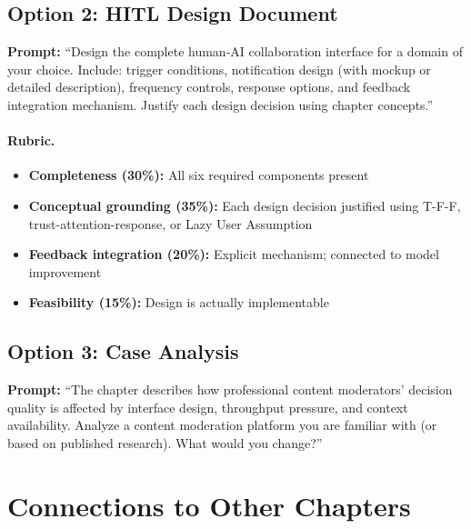 \subsection{Option 2: HITL Design Document}

\textbf{Prompt:} ``Design the complete human-AI collaboration interface for a domain of your choice. Include: trigger conditions, notification design (with mockup or detailed description), frequency controls, response options, and feedback integration mechanism. Justify each design decision using chapter concepts.''

\paragraph{Rubric.}
\begin{itemize}
    \item \textbf{Completeness (30\%):} All six required components present
    \item \textbf{Conceptual grounding (35\%):} Each design decision justified using T-F-F, trust-attention-response, or Lazy User Assumption
    \item \textbf{Feedback integration (20\%):} Explicit mechanism; connected to model improvement
    \item \textbf{Feasibility (15\%):} Design is actually implementable
\end{itemize}

\subsection{Option 3: Case Analysis}

\textbf{Prompt:} ``The chapter describes how professional content moderators' decision quality is affected by interface design, throughput pressure, and context availability. Analyze a content moderation platform you are familiar with (or based on published research). What would you change?''

\section{Connections to Other Chapters}

